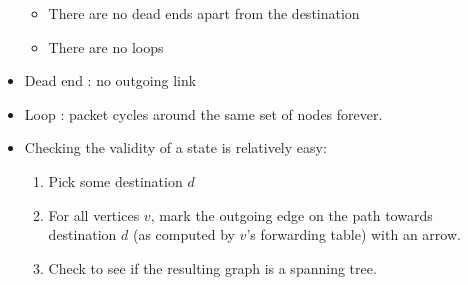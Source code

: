 \begin{itemize}
  \begin{itemize}
  \tightlist
  \item
    There are no dead ends apart from the destination
  \item
    There are no loops
  \end{itemize}
\item
  Dead end : no outgoing link
\item
  Loop : packet cycles around the same set of nodes forever.
\item
  Checking the validity of a state is relatively easy:

  \begin{enumerate}
  \def\labelenumi{\arabic{enumi}.}
  \tightlist
  \item
    Pick some destination \(d\)
  \item
    For all vertices \(v\), mark the outgoing edge on the path towards
    destination \(d\) (as computed by \(v\)'s forwarding table) with an
    arrow.
  \item
    Check to see if the resulting graph is a spanning tree.
  \end{enumerate}
\end{itemize}

\href{src/routing1.png}{}

\href{src/routing2.png}{}

\href{src/routing3.png}{}

\href{src/routing4.png}{}

\href{src/routing5.png}{}

